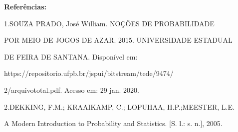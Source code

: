 \documentclass{article}
\begin{document}
\hfill

\textbf{Referências:} \

\hfill

1.SOUZA PRADO, José William. NOÇÕES DE PROBABILIDADE 
\hfill

POR MEIO DE JOGOS DE AZAR. 2015. UNIVERSIDADE ESTADUAL
\hfill

DE FEIRA DE SANTANA. Disponível em:
\hfill 

https://repositorio.ufpb.br/jspui/bitstream/tede/9474/
\hfill

2/arquivototal.pdf. Acesso em: 29 jan. 2020.

\hfill

2.DEKKING, F.M.; KRAAIKAMP, C.; LOPUHAA, H.P.;MEESTER, L.E.
\hfill 

A Modern Introduction to Probability and Statistics. [S. l.: s. n.], 2005.
\end{document}
